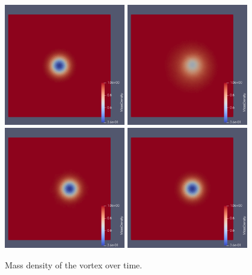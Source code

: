 \begin{figure}[p]
\centering
{} {
	\includegraphics[width=0.47\textwidth]{vortex1.png}
} \hfill
{} {
	\includegraphics[width=0.47\textwidth]{vortex2.png}
} \\[2em]
 {
	\includegraphics[width=0.47\textwidth]{vortex3.png}
} \hfill
{} {
	\includegraphics[width=0.47\textwidth]{vortex4.png}
}
\caption{Mass density of the vortex over time.}
\label{fig:comparison-vortex}
\end{figure}

